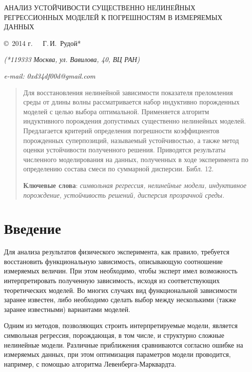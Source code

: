 \documentclass[11pt,a4paper]{article}
\theoremstyle{definition}
\begin{document}
\begin{center}
  АНАЛИЗ УСТОЙЧИВОСТИ СУЩЕСТВЕННО НЕЛИНЕЙНЫХ РЕГРЕССИОННЫХ МОДЕЛЕЙ К ПОГРЕШНОСТЯМ В ИЗМЕРЯЕМЫХ
  ДАННЫХ

  \bigskip
  \copyright\ 2014 г.\ \ \ Г.\,И.~Рудой*

  {
	\small
	\emph{(*119333 Москва, ул. Вавилова, 40, ВЦ РАН)}

	\emph{e-mail: 0xd34df00d@gmail.com}
  }
\end{center}

\renewcommand{\abstractname}{}
\begin{abstract}
  Для восстановления нелинейной зависимости показателя преломления среды от длины
  волны рассматривается набор индуктивно порожденных моделей с целью выбора оптимальной.
  Применяется алгоритм индуктивного порождения допустимых существенно
  нелинейных моделей. Предлагается критерий определения погрешности коэффициентов порожденных
  суперпозиций, называемый устойчивостью, а также метод оценки устойчивости полученного решения.
  Приводятся результаты численного моделирования на данных, полученных в ходе
  эксперимента по определению состава смеси по суммарной дисперсии. Библ. 12.

  \bigskip
  \textbf{Ключевые слова}: \emph{символьная регрессия, нелинейные модели, индуктивное порождение,
	устойчивость решений, дисперсия прозрачной среды.}
\end{abstract}

\section{Введение}

Для анализа результатов физического эксперимента, как правило, требуется
восстановить функциональную зависимость, описывающую соотношение измеряемых
величин. При этом необходимо, чтобы эксперт имел возможность интерпретировать
полученную зависимость, исходя из соответствующих теоретических моделей. Во
многих случаях вид функциональной зависимости заранее известен, либо необходимо
сделать выбор между несколькими (также заранее известными) вариантами моделей.

Одним из методов, позволяющих строить интерпретируемые модели, является
символьная регрессия\cite{davidson:2000:snrea,reference/ml/X10vc,StrijovW10,Strijov08InductMethods,Rudoy13},
порождающая, в том числе, и структурно сложные нелинейные модели. Различные
приближения сравниваются согласно ошибке на измеряемых данных, при этом оптимизация
параметров модели проводится, например, с помощью алгоритма Левенберга-Марквардта\cite{Marquardt1963Algorithm,more:78}.
\end{document}
